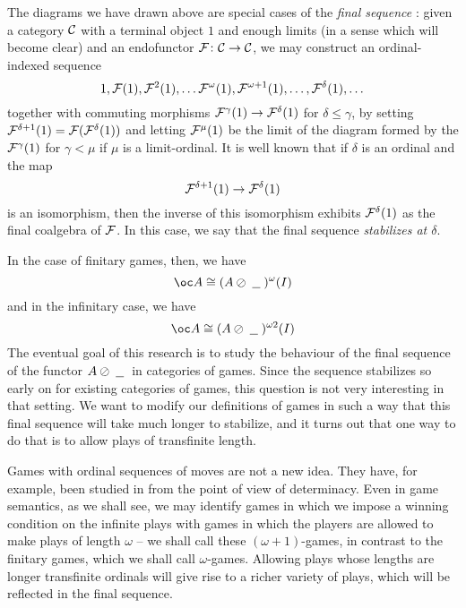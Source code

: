 \documentclass[11pt]{article} %
\begin{document}
The diagrams we have drawn above are special cases of the \emph{final sequence} \cite{finalseq}: given a category ${\mathcal{C}}$ with a terminal object $1$ and enough limits (in a sense which will become clear) and an endofunctor $\mathcal F\colon{}{\mathcal{C}}\to{}{\mathcal{C}}$, we may construct an ordinal-indexed sequence
\[
  1, \mathcal F(1), \mathcal F^2(1),\dots \mathcal F^\omega(1), \mathcal F^{\omega+1}(1),\dots,\mathcal F^\delta(1),\dots
  \]
together with commuting morphisms $\mathcal F^\gamma(1)\to\mathcal F^\delta(1)$ for $\delta\le\gamma$, by setting $\mathcal F^{\delta+1}(1) = \mathcal F(\mathcal F^\delta(1))$ and letting $\mathcal F^\mu(1)$ be the limit of the diagram formed by the $\mathcal F^\gamma(1)$ for $\gamma<\mu$ if $\mu$ is a limit-ordinal.  It is well known that if $\delta$ is an ordinal and the map
\[
  \mathcal F^{\delta+1}(1)\to\mathcal F^{\delta}(1)
  \]
is an isomorphism, then the inverse of this isomorphism exhibits $\mathcal F^{\delta}(1)$ as the final coalgebra of $\mathcal F$.  In this case, we say that the final sequence \emph{stabilizes at $\delta$}.  

In the case of finitary games, then, we have
\[
  \oc A\cong(A\sequoid\blank)^\omega(I)
  \]
and in the infinitary case, we have
\[
  \oc A\cong(A\sequoid\blank)^{\omega2}(I)
  \]
The eventual goal of this research is to study the behaviour of the final sequence of the functor $A\oslash\;\underline{\hspace{1.5ex}}\;$ in categories of games.  Since the sequence stabilizes so early on for existing categories of games, this question is not very interesting in that setting.  We want to modify our definitions of games in such a way that this final sequence will take much longer to stabilize, and it turns out that one way to do that is to allow plays of transfinite length.  

Games with ordinal sequences of moves are not a new idea.  They have, for example, been studied in \cite{longgamesbook} from the point of view of determinacy.  Even in game semantics, as we shall see, we may identify games in which we impose a winning condition on the infinite plays with games in which the players are allowed to make plays of length $\omega$ -- we shall call these $(\omega+1)$-games, in contrast to the finitary games, which we shall call $\omega$-games.  Allowing plays whose lengths are longer transfinite ordinals will give rise to a richer variety of plays, which will be reflected in the final sequence.  
\end{document}
